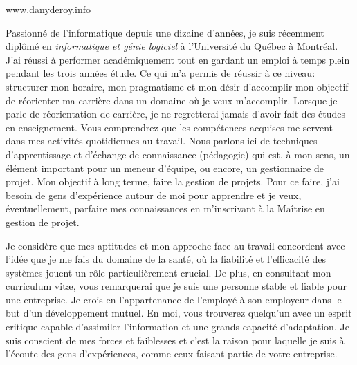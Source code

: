 \documentclass[11pt, letterpaper]{awesome-cv}
\begin{document}
\makecvheader

\makecvfooter
  {}
  {www.danyderoy.info}
  {}

\makelettertitle

\begin{cvletter}

Passionné de l'informatique depuis une dizaine d'années, je suis récemment diplômé en \emph{informatique et génie logiciel} à l'Université du Québec à Montréal. J'ai réussi à performer académiquement tout en gardant un emploi à temps plein pendant les trois années étude. Ce qui m'a permis de réussir à ce niveau: structurer mon horaire, mon pragmatisme et mon désir d'accomplir mon objectif de réorienter ma carrière dans un domaine où je veux m'accomplir. Lorsque je parle de réorientation de carrière, je ne regretterai jamais d'avoir fait des études en enseignement. Vous comprendrez que les compétences acquises me servent dans mes activités quotidiennes au travail. Nous parlons ici de techniques d'apprentissage et d'échange de connaissance (pédagogie) qui est, à mon sens, un élément important pour un meneur d'équipe, ou encore, un gestionnaire de projet. Mon objectif à long terme, faire la gestion de projets. Pour ce faire, j'ai besoin de gens d'expérience autour de moi pour apprendre et je veux, éventuellement, parfaire mes connaissances en m'inscrivant à la Maîtrise en gestion de projet.



Je considère que mes aptitudes et mon approche face au travail concordent avec l'idée que je me fais du domaine de la santé, où la fiabilité et l'efficacité des systèmes jouent un rôle particulièrement crucial. De plus, en consultant mon curriculum vitæ, vous remarquerai que je suis une personne stable et fiable pour une entreprise. Je crois en l'appartenance de l'employé à son employeur dans le but d'un développement mutuel. En moi, vous trouverez quelqu'un avec un esprit critique capable d'assimiler l'information et une grands capacité d'adaptation. Je suis conscient de mes forces et faiblesses et c'est la raison pour laquelle je suis à l'écoute des gens d'expériences, comme ceux faisant partie de votre entreprise.

\end{cvletter}


\makeletterclosing
\end{document}
